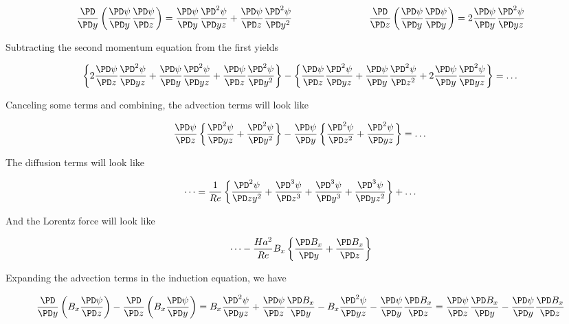 \documentclass[11pt]{article}
\begin{document}
\begin{equation}
	\frac{\PD}{\PD y}
	\left(
	\frac{\PD \psi}{\PD y}
	\frac{\PD \psi}{\PD z}
	\right)
	=
	\frac{\PD \psi}{\PD y}
	\frac{\PD^2 \psi}{\PD yz} +
	\frac{\PD \psi}{\PD z}
	\frac{\PD^2 \psi}{\PD y^2}
	\qquad \qquad
	\qquad \qquad
	\frac{\PD}{\PD z}
	\left(
	\frac{\PD \psi}{\PD y}
	\frac{\PD \psi}{\PD y}
	\right)
	=
	2
	\frac{\PD \psi }{\PD y}
	\frac{\PD^2 \psi}{\PD yz}
\end{equation}

Subtracting the second momentum equation from the first yields

\begin{equation}
	\left\{
	2
	\frac{\PD \psi }{\PD z}
	\frac{\PD^2 \psi}{\PD yz}
	+
	\frac{\PD \psi}{\PD y}
	\frac{\PD^2 \psi}{\PD yz} +
	\frac{\PD \psi}{\PD z}
	\frac{\PD^2 \psi}{\PD y^2}
	\right\}
	-
	\left\{
	\frac{\PD \psi}{\PD z}
	\frac{\PD^2 \psi}{\PD yz} +
	\frac{\PD \psi}{\PD y}
	\frac{\PD^2 \psi}{\PD z^2}
	+
	2
	\frac{\PD \psi }{\PD y}
	\frac{\PD^2 \psi}{\PD yz}
	\right\}
	=
	\dots
\end{equation}

Canceling some terms and combining, the advection terms will look like


\begin{equation}
	\frac{\PD \psi }{\PD z}
	\left\{
	\frac{\PD^2 \psi}{\PD yz}
	+
	\frac{\PD^2 \psi}{\PD y^2}
	\right\}
	-
	\frac{\PD \psi}{\PD y}
	\left\{
	\frac{\PD^2 \psi}{\PD z^2}
	+
	\frac{\PD^2 \psi}{\PD yz}
	\right\}
	=
	\dots
\end{equation}


The diffusion terms will look like

\begin{equation}
	\dots
	=
	\frac{1}{Re}
	\left\{
	\frac{\PD^2 \psi}{\PD z y^2}
	+
	\frac{\PD^3 \psi}{\PD z^3}
	+
	\frac{\PD^3 \psi}{\PD y^3}
	+\frac{\PD^3 \psi}{\PD y z^2}
	\right\}
	+ \dots
\end{equation}

And the Lorentz force will look like

\begin{equation}
	\dots
	-
	\frac{Ha^2}{Re}
	B_x
	\left\{
	\frac{\PD B_x}{\PD y}
	+
	\frac{\PD B_x}{\PD z}
	\right\}
\end{equation}

Expanding the advection terms in the induction equation, we have

\begin{equation}
	\frac{\PD}{\PD y} \left( B_x \frac{\PD \psi}{\PD z} \right)
	- \frac{\PD}{\PD z} \left( B_x \frac{\PD \psi}{\PD y} \right)
	=
	B_x \frac{\PD^2 \psi}{\PD yz}
	+
	\frac{\PD \psi}{\PD z}
	\frac{\PD B_x}{\PD y}
	-
	B_x
	\frac{\PD^2 \psi}{\PD y z}
	-
	\frac{\PD \psi}{\PD y}
	\frac{\PD B_x}{\PD z}
	=
	\frac{\PD \psi}{\PD z}
	\frac{\PD B_x}{\PD y}
	-
	\frac{\PD \psi}{\PD y}
	\frac{\PD B_x}{\PD z}
\end{equation}
\end{document}
